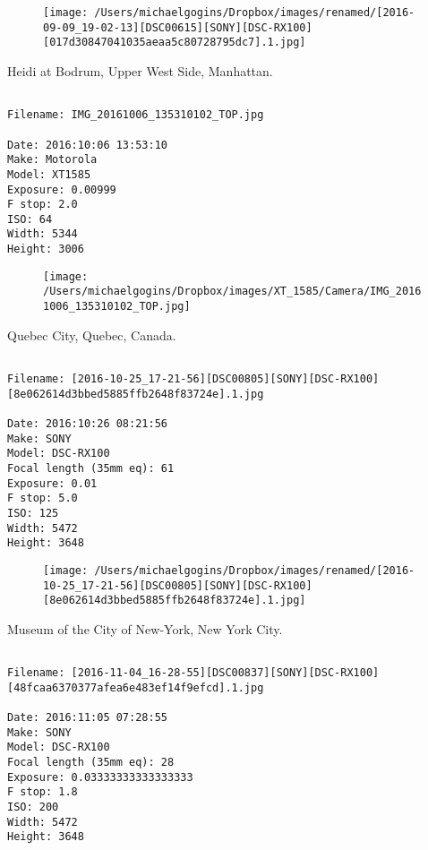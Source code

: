 \documentclass[11pt,letter,DIV=14,paper=landscape]{scrbook}
\begin{document}
\begin{figure}
\texttt{[image: /Users/michaelgogins/Dropbox/images/renamed/[2016-09-09\_19-02-13][DSC00615][SONY][DSC-RX100][017d30847041035aeaa5c80728795dc7].1.jpg]}
\end{figure}
    
\clearpage
\noindent Heidi at Bodrum, Upper West Side, Manhattan.
\noindent
\begin{lstlisting}

Filename: IMG_20161006_135310102_TOP.jpg

Date: 2016:10:06 13:53:10
Make: Motorola
Model: XT1585
Exposure: 0.00999
F stop: 2.0
ISO: 64
Width: 5344
Height: 3006
\end{lstlisting}
\clearpage

\begin{figure}
\texttt{[image: /Users/michaelgogins/Dropbox/images/XT\_1585/Camera/IMG\_20161006\_135310102\_TOP.jpg]}
\end{figure}
    
\clearpage
\noindent Quebec City, Quebec, Canada.
\noindent
\begin{lstlisting}

Filename: [2016-10-25_17-21-56][DSC00805][SONY][DSC-RX100][8e062614d3bbed5885ffb2648f83724e].1.jpg

Date: 2016:10:26 08:21:56
Make: SONY
Model: DSC-RX100
Focal length (35mm eq): 61
Exposure: 0.01
F stop: 5.0
ISO: 125
Width: 5472
Height: 3648
\end{lstlisting}
\clearpage

\begin{figure}
\texttt{[image: /Users/michaelgogins/Dropbox/images/renamed/[2016-10-25\_17-21-56][DSC00805][SONY][DSC-RX100][8e062614d3bbed5885ffb2648f83724e].1.jpg]}
\end{figure}
    
\clearpage
\noindent Museum of the City of New-York, New York City.
\noindent
\begin{lstlisting}

Filename: [2016-11-04_16-28-55][DSC00837][SONY][DSC-RX100][48fcaa6370377afea6e483ef14f9efcd].1.jpg

Date: 2016:11:05 07:28:55
Make: SONY
Model: DSC-RX100
Focal length (35mm eq): 28
Exposure: 0.03333333333333333
F stop: 1.8
ISO: 200
Width: 5472
Height: 3648
\end{lstlisting}
\clearpage
\end{document}
